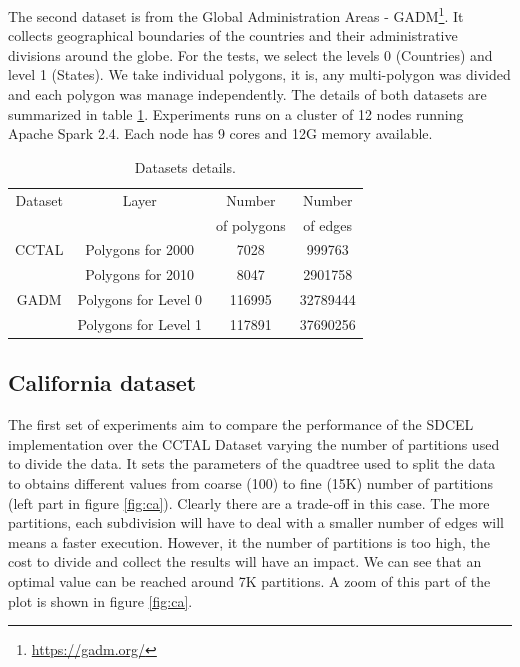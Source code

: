 The second dataset is from the Global Administration Areas - GADM\footnote{\url{https://gadm.org/}}. It collects geographical boundaries of the countries and their administrative divisions around the globe.  For the tests, we select the levels 0 (Countries) and level 1 (States). We take individual polygons, it is, any multi-polygon was divided and each polygon was manage independently. The details of both datasets are summarized in table \ref{tab:datasets}.  Experiments runs on a cluster of 12 nodes running Apache Spark 2.4.  Each node has 9 cores and 12G memory available.

\begin{table}[!ht]
    \caption{Datasets details.}
    \label{tab:datasets}
    \begin{tabular}{c c c c}
        \toprule
        Dataset & Layer & Number        & Number    \\
                &       & of polygons   & of edges  \\
        \midrule
        CCTAL & Polygons for 2000 & 7028 & 999763  \\
              & Polygons for 2010 & 8047 & 2901758 \\
        GADM  & Polygons for Level 0 & 116995 & 32789444 \\
              & Polygons for Level 1 & 117891 & 37690256 \\
        \bottomrule
    \end{tabular}
\end{table}

\subsection{California dataset}

The first set of experiments aim to compare the performance of the SDCEL implementation over the CCTAL Dataset varying the number of partitions used to divide the data. It sets the parameters of the quadtree used to split the data to obtains different values from coarse (100) to fine (15K) number of partitions (left part in figure \ref{fig:ca}).  Clearly there are a trade-off in this case.  The more partitions, each subdivision will have to deal with a smaller number of edges will means a faster execution.  However, it the number of partitions is too high, the cost to divide and collect the results will have an impact.  We can see that an optimal value can be reached around 7K partitions.  A zoom of this part of the plot is shown in figure \ref{fig:ca}.


